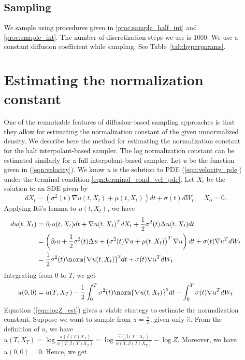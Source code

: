 \subsection{Sampling}
We sample using procedures given in \ref{proc:sample_half_int} and \ref{proc:smaple_int}. The number of discretization steps we use is $1000$. We use a constant diffusion coefficient while sampling. See Table~\ref{tab:hyperparams}. 

\section{Estimating the normalization constant}\label{apndx:est_logZ}
One of the remarkable features of diffusion-based sampling approaches is that they allow for estimating the normalization constant of the given unnormalized density. We describe here the method for estimating the normalization constant for the half interpolant-based sampler. The log normalization constant can be estimated similarly for a full interpolant-based sampler. Let $u$ be the function given in (\ref{eqn:velocity}). We know $u$ is the solution to PDE (\ref{eqn:velocity_pde}) under the terminal condition \ref{eqn:terminal_cond_vel_pde}. Let $X_t$ be the solution to an SDE given by
\begin{equation*}
    dX_t = \left(\sigma^2(t)\nabla u(t,X_t)+ \mu(t,X_t)\right)dt + \sigma(t)dW_t,\quad X_0=0.
\end{equation*}
Applying It\^o's lemma to $u(t,X_t)$, we have
\begin{align*}
    du(t,X_t) &= \partial_t u(t,X_t)dt + \nabla u(t,X_t)^TdX_t + \frac{1}{2}\sigma^2(t)\Delta u(t,X_t)dt\\
    &=  \left(\partial_t u+\frac{1}{2}\sigma^2(t)\Delta u+\left(\sigma^2(t)\nabla u +\mu(t,X_t)\right)^T\nabla u\right)dt + \sigma(t)\nabla u^TdW_t\\
    &=  \frac{1}{2}\sigma^2(t)\norm{\nabla u(t,X_t)}^2dt + \sigma(t)\nabla u^TdW_t\\
\end{align*}
Integrating from $0$ to $T$, we get
\begin{equation}\label{eqn:logZ_est}
    u(0,0) = u(T,X_T)-\frac{1}{2}\int_0^T\sigma^2(t)\norm{\nabla u(t,X_t)}^2dt-\int_0^T\sigma(t)\nabla u^TdW_t
\end{equation}
Equation (\ref{eqn:logZ_est}) gives a viable strategy to estimate the normalization constant. Suppose we want to sample from $\pi = \frac{\hat{\pi}}{Z}$, given only $\hat{\pi}$. From the definition of $u$, we have $u(T,X_T) = \log\frac{\pi(\beta(T)X_T)}{\psi(T,\beta(T)X_T)} = \log\frac{\hat{\pi}(\beta(T)X_T)}{\psi(T,\beta(T)X_T)} - \log Z $. Moreover, we have $u(0,0) = 0$. Hence, we get
